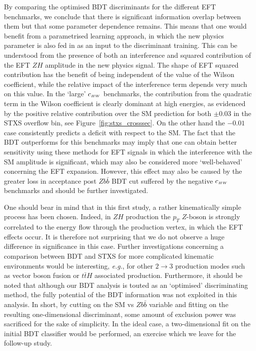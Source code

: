 By comparing the optimised BDT discriminants for the different EFT benchmarks, we conclude that there is significant information overlap between them but that some parameter dependence remains. This means that one would benefit from a parametrised learning approach, in which the new physics parameter is also fed in as an input to the discriminant training. This can be understood from the presence of both an interference and squared contribution of the EFT $ZH$ amplitude in the new physics signal. The shape of EFT squared contribution has the benefit of being independent of the value of the Wilson coefficient, while the relative impact of the interference term depends very much on this value. In the `large' $c_{\scriptscriptstyle HW}$ benchmarks, the contribution from the quadratic term in the Wilson coefficient is clearly dominant at high energies, as evidenced by the positive relative contribution over the SM prediction for both $\pm0.03$ in the STXS overflow bin, see Figure~\ref{fig:stxs_crosssec}. On the other hand the $-0.01$ case consistently predicts a deficit with respect to the SM. The fact that the BDT outperforms for this benchmarks may imply that one can obtain better sensitivity using these methods for EFT signals in which the interference with the SM amplitude is significant, which may also be considered more `well-behaved' concerning the EFT expansion. However, this effect may also be caused by the greater loss in acceptance post $Zb\bar{b}$ BDT cut suffered by the negative $c_{\scriptscriptstyle HW}$ benchmarks and should be further investigated.

One should bear in mind that in this first study, a rather kinematically simple process has been chosen.
Indeed, in $ZH$ production the $p_T$ $Z$-boson is strongly correlated to the energy flow through the production vertex, in which the EFT effects occur. It is therefore not surprising that we do not observe a huge difference in significance in this case. Further investigations concerning a comparison between BDT and STXS for more complicated kinematic environments would be interesting, \emph{e.g.}, for other $2\to3$ production modes such as vector boson fusion or $t\bar{t}H$ associated production.  Furthermore, it should be noted that although our BDT analysis is touted as an `optimised' discriminating method, the fully potential of the BDT information was not exploited in this analysis. In short, by cutting on the SM vs $Zb\bar{b}$ variable and fitting on the resulting one-dimensional discriminant, some amount of exclusion power was sacrificed for the sake of simplicity. In the ideal case, a two-dimensional fit on the initial BDT classifier would be performed, an exercise which we leave for the follow-up study.
